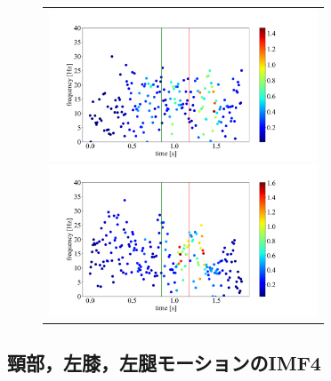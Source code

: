 \begin{figure}
    \begin{center}
        \begin{tabular}{c}
            \begin{minipage}{0.5\hsize}
                \begin{center}
                    \includegraphics[width=8cm]{./images/straight_data/neck/IMF1.png}
                \end{center}
            \end{minipage}

            \begin{minipage}{0.5\hsize}
                \begin{center}
                    \includegraphics[width=8cm]{./images/straight_data/left_leg/IMF1.png}
                \end{center}
            \end{minipage}
        \end{tabular}
    \end{center}
\end{figure}

\subsection{頸部，左膝，左腿モーションのIMF4}